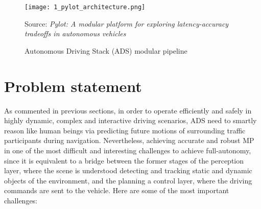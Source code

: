 \begin{figure}[h]
	\centering
	\texttt{[image: 1\_pylot\_architecture.png]}
	\caption{Autonomous Driving Stack (ADS) modular pipeline}
	Source: \textit{Pylot: A modular platform for exploring latency-accuracy tradeoffs in autonomous vehicles} \cite{gog2021pylot}
	\label{fig:1_pylot_architecture}
\end{figure}

\section{Problem statement}
\label{sec:1_problem_statement}

As commented in previous sections, in order to operate efficiently and safely in highly dynamic, complex and interactive driving scenarios, \acs{ADS} need to smartly reason like human beings via predicting future motions of surrounding traffic participants during navigation. Nevertheless, achieving accurate and robust \ac{MP} in one of the most difficult and interesting challenges to achieve full-autonomy, since it is equivalent to a bridge between the former stages of the perception layer, where the scene is understood detecting and tracking static and dynamic objects of the environment, and the planning a control layer, where the driving commands are sent to the vehicle. Here are some of the most important challenges: 

